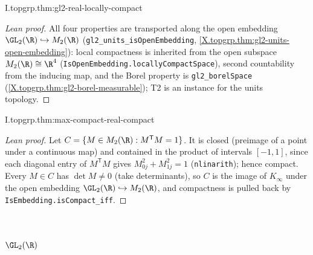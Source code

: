 \begin{theorem}
\end{theorem}
\begin{tfformal}{I.topgrp.thm:gl2-real-locally-compact}
\end{tfformal}
\begin{proof}[Lean proof]
All four properties are transported along the open embedding $\GL_2(\R)\hookrightarrow M_2(\R)$ (\texttt{gl2\_units\_isOpenEmbedding}, \cref{X.topgrp.thm:gl2-units-open-embedding}): local compactness is inherited from the open subspace $M_2(\R)\cong\R^4$ (\texttt{IsOpenEmbedding.locallyCompactSpace}), second countability from the inducing map, and the Borel property is \texttt{gl2\_borelSpace} (\cref{X.topgrp.thm:gl2-borel-measurable}); T2 is an instance for the units topology.
\end{proof}

\begin{theorem}
\end{theorem}
\begin{tfformal}{I.topgrp.thm:max-compact-real-compact}
\end{tfformal}
\begin{proof}[Lean proof]
Let $C=\{M\in M_2(\R):M^{\mathsf T}M=1\}$. It is closed (preimage of a point under a continuous map) and contained in the product of intervals $[-1,1]$, since each diagonal entry of $M^{\mathsf T}M$ gives $M_{0j}^2+M_{1j}^2=1$ (\texttt{nlinarith}); hence compact. Every $M\in C$ has $\det M\neq0$ (take determinants), so $C$ is the image of $K_\infty$ under the open embedding $\GL_2(\R)\hookrightarrow M_2(\R)$, and compactness is pulled back by \texttt{IsEmbedding.isCompact\_iff}.
\end{proof}


\section{\texorpdfstring{$\GL_2(\R)$}{GL₂(ℝ)}}

